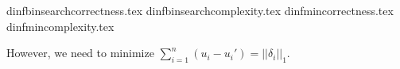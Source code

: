 \documentclass[11pt]{llncs}
\begin{document}
  {dinfbinsearchcorrectness.tex}
  {dinfbinsearchcomplexity.tex}
  {dinfmincorrectness.tex}
  {dinfmincomplexity.tex}

  However, we need to minimize $\sum\limits_{i=1}^{n}\left(u_i-u_i'\right) = ||\delta_i||_1$.
\end{document}
